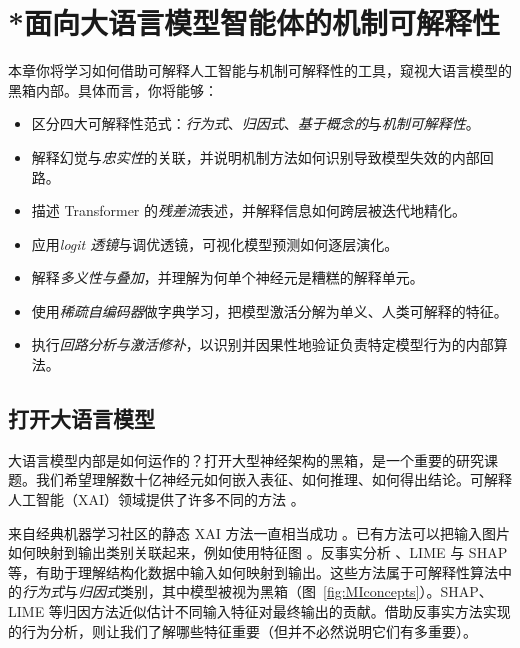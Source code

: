
\chapter{*面向大语言模型智能体的机制可解释性}\label{chap:mi}

\begin{learningbox}
本章你将学习如何借助可解释人工智能与机制可解释性的工具，窥视大语言模型的黑箱内部。具体而言，你将能够：
\begin{itemize}[leftmargin=*, nosep]
    \item 区分四大可解释性范式：\textit{行为式}、\textit{归因式}、\textit{基于概念的}与\textit{机制可解释性}。
    \item 解释幻觉与{\em 忠实性}的关联，并说明机制方法如何识别导致模型失效的内部回路。
    \item 描述 Transformer 的{\em 残差流}表述，并解释信息如何跨层被迭代地精化。
    \item 应用{\em logit 透镜}与调优透镜，可视化模型预测如何逐层演化。
    \item 解释{\em 多义性与叠加}，并理解为何单个神经元是糟糕的解释单元。
    \item 使用{\em 稀疏自编码器}做字典学习，把模型激活分解为单义、人类可解释的特征。
    \item 执行{\em 回路分析与激活修补}，以识别并因果性地验证负责特定模型行为的内部算法。
\end{itemize}
\end{learningbox}

\section{打开大语言模型}
大语言模型内部是如何运作的？打开大型神经架构的黑箱，是一个重要的研究课题。我们希望理解数十亿神经元如何嵌入表征、如何推理、如何得出结论。可解释人工智能（XAI）领域提供了许多不同的方法 \citep{minh2022explainable,rios2020feature,van2022comparison,selvaraju2017grad,ali2022xai}。

来自经典机器学习社区的静态 XAI 方法一直相当成功 \citep{molnar2020interpretable}。已有方法可以把输入图片如何映射到输出类别关联起来，例如使用特征图 \citep{ren2016object,kohonen1982self,redmon2016you}。反事实分析 \citep{karimi2020model,explains24}、LIME \citep{ribeiro2016should} 与 SHAP \citep{lundberg2017unified} 等，有助于理解结构化数据中输入如何映射到输出。这些方法属于可解释性算法中的\emph{行为式}与\emph{归因式}类别，其中模型被视为黑箱（图~\ref{fig:MIconcepts}）。SHAP、LIME 等归因方法近似估计不同输入特征对最终输出的贡献。借助反事实方法实现的行为分析，则让我们了解哪些特征重要（但并不必然说明它们有多重要）。%

